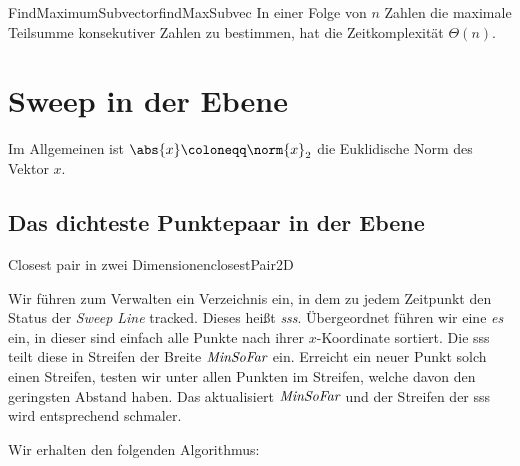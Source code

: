 \documentclass[language=ngerman,algolist,acrolist]{TemplateLecture}
\begin{document}
\begin{algorithm}[h]
    \caption{\textsc{FindMaximumSubvector}}
    \begin{algorithmic}[1]
            \State{$\MaxSF \gets \max(\MaxSF, \MaxEndHere)$}
        \EndFor{}
        \State{\Return{$\MaxSF$}}
    \end{algorithmic}
\end{algorithm}

\begin{thm}{FindMaximumSubvector}{findMaxSubvec}
    In einer Folge von $n$ Zahlen die maximale Teilsumme konsekutiver Zahlen zu bestimmen, hat die Zeitkomplexität $\Theta(n)$.
\end{thm}



\section{Sweep in der Ebene}

Im Allgemeinen ist $\abs{x} \coloneqq \norm{x}_2$ die Euklidische Norm des Vektor $x$.

\subsection{Das dichteste Punktepaar in der Ebene}
 
\begin{prob}{Closest pair in zwei Dimensionen}{closestPair2D}
\end{prob}

Wir führen zum Verwalten ein Verzeichnis ein, in dem zu jedem Zeitpunkt den Status der \emph{Sweep Line} tracked. Dieses heißt \emph{\ac{sss}}. Übergeordnet führen wir eine \emph{\ac{es}} ein, in dieser sind einfach alle Punkte nach ihrer $x$-Koordinate sortiert. Die \ac{sss} teilt diese in Streifen der Breite $\textit{MinSoFar}$ ein. Erreicht ein neuer Punkt solch einen Streifen, testen wir unter allen Punkten im Streifen, welche davon den geringsten Abstand haben. Das aktualisiert $\textit{MinSoFar}$ und der Streifen der \ac{sss} wird entsprechend schmaler.

Wir erhalten den folgenden Algorithmus:
\end{document}
